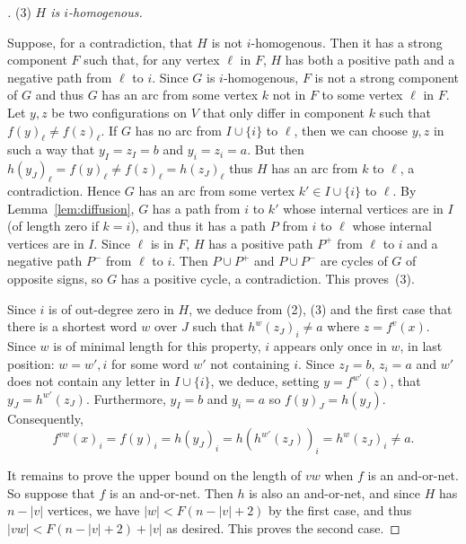 \documentclass[11pt,letter]{article}
\newcommand{\BF}[1]{{{\boldmath{\bf #1}\unboldmath}}}
\begin{document}
\begin{proof}[\BF{Proof of Lemmas~\ref{lem:no_fixed_vertex} and \ref{lem:no_fixed_vertex_2}}]
\bigskip
\noindent
(3) {\em $H$ is $i$-homogenous.}

\medskip
\noindent
Suppose, for a contradiction, that $H$ is not $i$-homogenous. Then it has a strong component $F$ such that, for any vertex $\ell$ in $F$, $H$ has both a positive path and a negative path from $\ell$ to $i$. Since $G$ is $i$-homogenous, $F$ is not a strong component of $G$ and thus $G$ has an arc from some vertex $k$ not in $F$ to some vertex $\ell$ in $F$. Let $y,z$ be two configurations on $V$ that only differ in component $k$ such that $f(y)_\ell\neq f(z)_\ell$. If $G$ has no arc from $I\cup\{i\}$ to $\ell$, then we can choose $y,z$ in such a way that $y_I=z_I=b$ and $y_i=z_i=a$. But then $h(y_J)_\ell=f(y)_\ell\neq f(z)_\ell= h(z_J)_\ell$ thus $H$ has an arc from $k$ to $\ell$, a contradiction. Hence $G$ has an arc from some vertex $k'\in I\cup\{i\}$ to $\ell$. By Lemma~\ref{lem:diffusion}, $G$ has a path from $i$ to $k'$ whose internal vertices are in $I$ (of length zero if $k=i$), and thus it has a path $P$ from $i$ to $\ell$ whose internal vertices are in $I$. Since $\ell$ is in $F$, $H$ has a positive path $P^+$ from $\ell$ to $i$ and a negative path $P^-$ from $\ell$ to $i$. Then $P\cup P^+$ and  $P\cup P^-$ are cycles of $G$ of opposite signs, so $G$ has a positive cycle, a contradiction. This proves~(3). 


\bigskip
Since $i$ is of out-degree zero in $H$, we deduce from (2), (3) and the first case that there is a shortest word $w$ over $J$ such that $h^w(z_J)_i\neq a$ where $z=f^{v}(x)$. Since $w$ is of minimal length for this property, $i$ appears only once in $w$, in last position: $w=w',i$ for some word $w'$ not containing $i$. Since $z_I=b$, $z_i=a$ and $w'$ does not contain any letter in $I\cup\{i\}$, we deduce, setting $y=f^{w'}(z)$, that $y_J=h^{w'}(z_J)$. Furthermore, $y_I=b$ and $y_i=a$ so $f(y)_J=h(y_J)$. Consequently, 
\[
f^{vw}(x)_i=f(y)_i=h(y_J)_i=h(h^{w'}(z_J))_i=h^w(z_J)_i\neq a.
\] 

\medskip
It remains to prove the upper bound on the length of $vw$ when $f$ is an and-or-net. So suppose that $f$ is an and-or-net. Then $h$ is also an and-or-net, and since $H$ has $n-|v|$ vertices, we have $|w|< F(n-|v|+2)$ by the first case, and thus $|vw|< F(n-|v|+2)+|v|$ as desired. This proves the second case. 
\end{proof}
\end{document}
